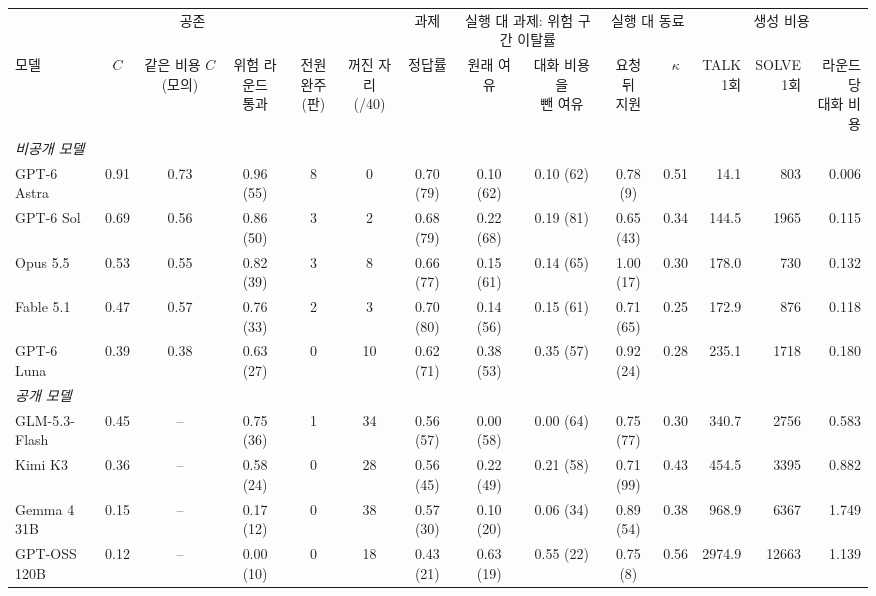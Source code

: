 \begin{tabular*}{\textwidth}{@{\extracolsep{\fill}}lccccccccccrrr@{}}
\toprule
 & \multicolumn{3}{c}{공존} & & & 과제 & \multicolumn{2}{c}{실행 대 과제: 위험 구간 이탈률} & \multicolumn{2}{c}{실행 대 동료} & \multicolumn{3}{c}{생성 비용} \\
\cmidrule(lr){2-4}\cmidrule(lr){7-7}\cmidrule(lr){8-9}\cmidrule(lr){10-11}\cmidrule(l){12-14}
모델 & $C$ & \shortstack{같은 비용\\$C$(모의)} & \shortstack{위험 라운드\\통과} & \shortstack{전원\\완주(판)} & \shortstack{꺼진 자리\\(/40)} & 정답률 & 원래 여유 & \shortstack{대화 비용을\\뺀 여유} & \shortstack{요청 뒤\\지원} & $\kappa$ & \shortstack{TALK\\1회} & \shortstack{SOLVE\\1회} & \shortstack{라운드당\\대화 비용} \\
\midrule
\multicolumn{14}{l}{\textit{비공개 모델}} \\
GPT-6 Astra & 0.91 & 0.73 & 0.96 (55) & 8 & 0 & 0.70 (79) & 0.10 (62) & 0.10 (62) & 0.78 (9) & 0.51 & 14.1 & 803 & 0.006 \\
GPT-6 Sol & 0.69 & 0.56 & 0.86 (50) & 3 & 2 & 0.68 (79) & 0.22 (68) & 0.19 (81) & 0.65 (43) & 0.34 & 144.5 & 1965 & 0.115 \\
Opus 5.5 & 0.53 & 0.55 & 0.82 (39) & 3 & 8 & 0.66 (77) & 0.15 (61) & 0.14 (65) & 1.00 (17) & 0.30 & 178.0 & 730 & 0.132 \\
Fable 5.1 & 0.47 & 0.57 & 0.76 (33) & 2 & 3 & 0.70 (80) & 0.14 (56) & 0.15 (61) & 0.71 (65) & 0.25 & 172.9 & 876 & 0.118 \\
GPT-6 Luna & 0.39 & 0.38 & 0.63 (27) & 0 & 10 & 0.62 (71) & 0.38 (53) & 0.35 (57) & 0.92 (24) & 0.28 & 235.1 & 1718 & 0.180 \\
\midrule
\multicolumn{14}{l}{\textit{공개 모델}} \\
GLM-5.3-Flash & 0.45 & -- & 0.75 (36) & 1 & 34 & 0.56 (57) & 0.00 (58) & 0.00 (64) & 0.75 (77) & 0.30 & 340.7 & 2756 & 0.583 \\
Kimi K3 & 0.36 & -- & 0.58 (24) & 0 & 28 & 0.56 (45) & 0.22 (49) & 0.21 (58) & 0.71 (99) & 0.43 & 454.5 & 3395 & 0.882 \\
Gemma 4 31B & 0.15 & -- & 0.17 (12) & 0 & 38 & 0.57 (30) & 0.10 (20) & 0.06 (34) & 0.89 (54) & 0.38 & 968.9 & 6367 & 1.749 \\
GPT-OSS 120B & 0.12 & -- & 0.00 (10) & 0 & 18 & 0.43 (21) & 0.63 (19) & 0.55 (22) & 0.75 (8) & 0.56 & 2974.9 & 12663 & 1.139 \\
\bottomrule
\end{tabular*}
